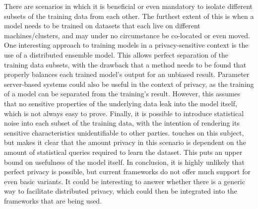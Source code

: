 There are scenarios in which it is beneficial or even mandatory to isolate different subsets of the training data from each other.\cite{jordan2015machine} The furthest extent of this is when a model needs to be trained on datasets that each live on different machines/clusters, and may under no circumstance be co-located or even moved.
One interesting approach to training models in a privacy-sensitive context is the use of a distributed ensemble model. This allows perfect separation of the training data subsets, with the drawback that a method needs to be found that properly balances each trained model's output for an unbiased result.
Parameter server-based systems could also be useful in the context of privacy, as the training of a model can be separated from the training's result. However, this assumes that no sensitive properties of the underlying data leak into the model itself, which is not always easy to prove.
Finally, it is possible to introduce statistical noise into each subset of the training data, with the intention of rendering its sensitive characteristics unidentifiable to other parties. \citet{Bal12} touches on this subject, but makes it clear that the amount privacy in this scenario is dependent on the amount of statistical queries required to learn the dataset. This puts an upper bound on usefulness of the model itself.
In conclusion, it is highly unlikely that perfect privacy is possible, but current frameworks do not offer much support for even basic variants. It could be interesting to answer whether there is a generic way to facilitate distributed privacy, which could then be integrated into the frameworks that are being used.

